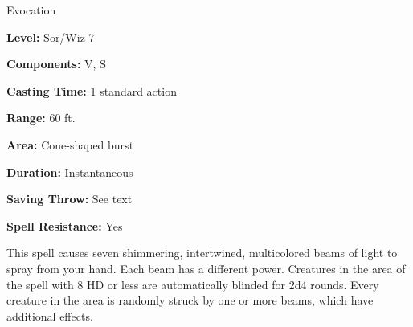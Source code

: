 
Evocation

\textbf{Level:} Sor/Wiz 7

\textbf{Components:} V, S

\textbf{Casting Time:} 1 standard action

\textbf{Range:} 60 ft.

\textbf{Area:} Cone-shaped burst

\textbf{Duration:} Instantaneous

\textbf{Saving Throw:} See text

\textbf{Spell Resistance:} Yes

This spell causes seven shimmering, intertwined, multicolored beams of light to 
spray from your hand. Each beam has a different power. Creatures in the area of 
the spell with 8 HD or less are automatically blinded for 2d4 rounds. Every creature 
in the area is randomly struck by one or more beams, which have additional effects.

